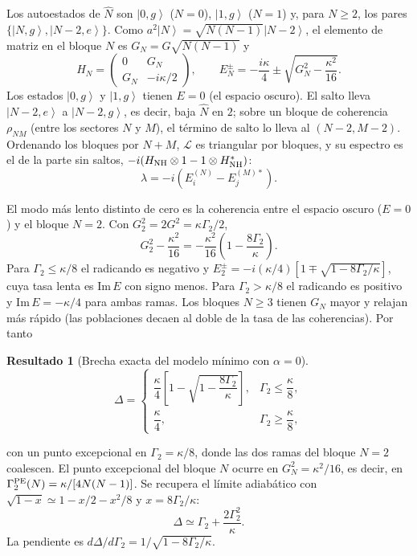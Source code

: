 \documentclass[11pt,a4paper]{article}
\newcommand{\ket}[1]{\left|#1\right\rangle}
\newcommand{\Lv}{\mathcal{L}}
\theoremstyle{definition}
\newtheorem{resultado}{Resultado}
\begin{document}
Los autoestados de $\hat N$ son $\ket{0,g}$ ($N=0$), $\ket{1,g}$ ($N=1$) y, para $N\geq2$, los pares $\{\ket{N,g},\ket{N-2,e}\}$. Como $a^2\ket{N}=\sqrt{N(N-1)}\ket{N-2}$, el elemento de matriz en el bloque $N$ es $G_N=G\sqrt{N(N-1)}$ y
\begin{equation}
H_N=\begin{pmatrix}0&G_N\\G_N&-i\kappa/2\end{pmatrix},\qquad E_N^{\pm}=-\frac{i\kappa}{4}\pm\sqrt{G_N^2-\frac{\kappa^2}{16}}.
\end{equation}
Los estados $\ket{0,g}$ y $\ket{1,g}$ tienen $E=0$ (el espacio oscuro). El salto lleva $\ket{N-2,e}$ a $\ket{N-2,g}$, es decir, baja $\hat N$ en $2$; sobre un bloque de coherencia $\rho_{NM}$ (entre los sectores $N$ y $M$), el término de salto lo lleva al $(N-2,M-2)$. Ordenando los bloques por $N+M$, $\Lv$ es triangular por bloques, y su espectro es el de la parte sin saltos, $-i(H_{\rm NH}\otimes1-1\otimes H_{\rm NH}^{*})$:
\begin{equation}
\lambda=-i\left(E_i^{(N)}-E_j^{(M)*}\right).
\end{equation}


El modo más lento distinto de cero es la coherencia entre el espacio oscuro ($E=0$) y el bloque $N=2$. Con $G_2^2=2G^2=\kappa\Gamma_2/2$,
\begin{equation}
G_2^2-\frac{\kappa^2}{16}=-\frac{\kappa^2}{16}\left(1-\frac{8\Gamma_2}{\kappa}\right).
\end{equation}
Para $\Gamma_2\leq\kappa/8$ el radicando es negativo y $E_2^{\pm}=-i(\kappa/4)[1\mp\sqrt{1-8\Gamma_2/\kappa}]$, cuya tasa lenta es $\mathrm{Im}\,E$ con signo menos. Para $\Gamma_2>\kappa/8$ el radicando es positivo y $\mathrm{Im}\,E=-\kappa/4$ para ambas ramas. Los bloques $N\geq3$ tienen $G_N$ mayor y relajan más rápido (las poblaciones decaen al doble de la tasa de las coherencias). Por tanto
\begin{resultado}[Brecha exacta del modelo mínimo con $\alpha=0$]
\begin{equation}
\boxed{\Delta=\begin{cases}\dfrac{\kappa}{4}\left[1-\sqrt{1-\dfrac{8\Gamma_2}{\kappa}}\right],&\Gamma_2\leq\dfrac{\kappa}{8},\\[2ex]\dfrac{\kappa}{4},&\Gamma_2\geq\dfrac{\kappa}{8},\end{cases}}
\label{eq:brecha}
\end{equation}
\end{resultado}
con un punto excepcional en $\Gamma_2=\kappa/8$, donde las dos ramas del bloque $N=2$ coalescen. El punto excepcional del bloque $N$ ocurre en $G_N^2=\kappa^2/16$, es decir, en $\Gamma_2^{\rm PE}(N)=\kappa/[4N(N-1)]$. Se recupera el límite adiabático con $\sqrt{1-x}\simeq1-x/2-x^2/8$ y $x=8\Gamma_2/\kappa$:
\begin{equation}
\Delta\simeq\Gamma_2+\frac{2\Gamma_2^2}{\kappa}.
\end{equation}
La pendiente es $d\Delta/d\Gamma_2=1/\sqrt{1-8\Gamma_2/\kappa}$.
\end{document}
